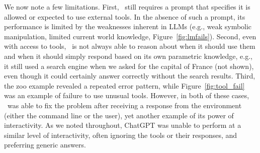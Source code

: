 We now note a few limitations. First, \DV\ still requires a prompt that specifies it is allowed or expected to use external tools. In the absence of such a prompt, its performance is limited by the weaknesses inherent in LLMs (e.g., weak symbolic manipulation, limited current world knowledge, Figure~\ref{fig:lmfails}). Second, even with access to tools, \DV\ is not always able to reason about when it should use them and when it should simply respond based on its own parametric knowledge, e.g., it still used a search engine when we asked for the capital of France (not shown), even though it could certainly answer correctly without the search results. Third, the zoo example revealed a repeated error pattern, while Figure~\ref{fig:tool_fail} was an example of failure to use unusual tools. However, in both of these cases, \DV\ was able to fix the problem after receiving a response from the environment (either the command line or the user), yet another example of its power of interactivity. As we noted throughout, ChatGPT was unable to perform at a similar level of interactivity, often ignoring the tools or their responses, and preferring generic answers.

